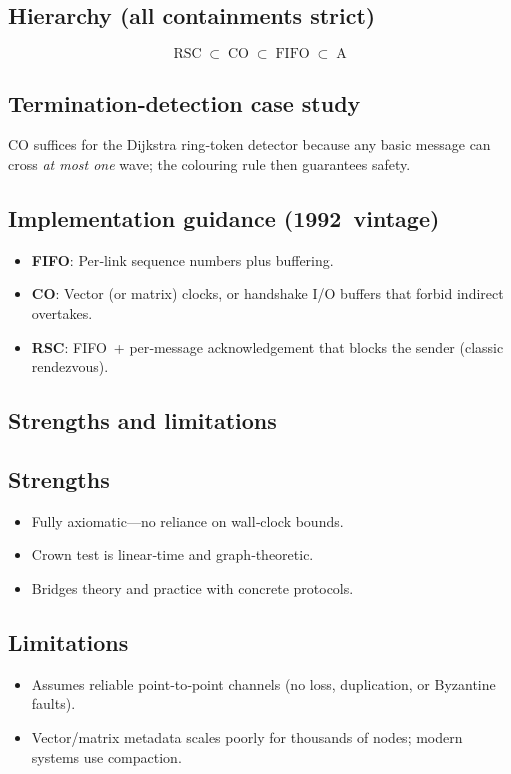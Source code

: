 \documentclass[../../../OAE-SPEC-MAIN.tex]{subfiles}
\begin{document}
\subsection{Hierarchy (all containments strict)}
\[
  \boxed{\text{RSC}} \;\subset\;
  \boxed{\text{CO}} \;\subset\;
  \boxed{\text{FIFO}} \;\subset\;
  \boxed{\text{A}}
\]

\subsection{Termination‑detection case study}
CO suffices for the Dijkstra ring‑token detector because any basic message can cross \emph{at most one} wave; the colouring rule then guarantees safety.

\subsection{Implementation guidance (1992 vintage)}

\begin{itemize}
  \item \textbf{FIFO}: Per‑link sequence numbers plus buffering.
  \item \textbf{CO}: Vector (or matrix) clocks, or handshake I/O buffers that forbid indirect overtakes.
  \item \textbf{RSC}: FIFO + per‑message acknowledgement that blocks the sender (classic rendezvous).
\end{itemize}

\subsection{Strengths and limitations}

\subsection*{Strengths}
\begin{itemize}
  \item Fully axiomatic—no reliance on wall‑clock bounds.
  \item Crown test is linear‑time and graph‑theoretic.
  \item Bridges theory and practice with concrete protocols.
\end{itemize}

\subsection*{Limitations}
\begin{itemize}
  \item Assumes reliable point‑to‑point channels (no loss, duplication, or Byzantine faults).
  \item Vector/matrix metadata scales poorly for thousands of nodes; modern systems use compaction.
\end{itemize}
\end{document}
